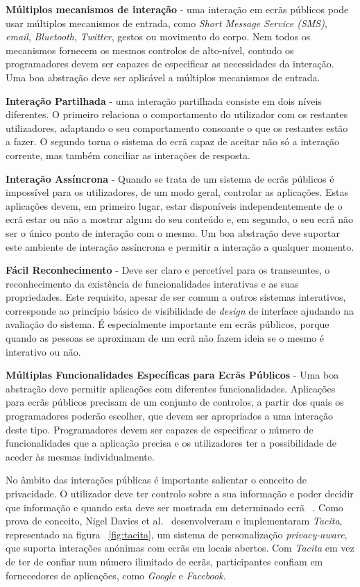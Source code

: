 \textbf{Múltiplos mecanismos de interação} - uma interação em ecrãs públicos pode usar múltiplos mecanismos de entrada, como \textit{Short Message Service (SMS)}, \textit{email}, \textit{Bluetooth}, \textit{Twitter}, gestos ou movimento do corpo. Nem todos os mecanismos fornecem os mesmos controlos de alto-nível, contudo os programadores devem ser capazes de especificar as necessidades da interação. Uma boa abstração deve ser aplicável a múltiplos mecanismos de entrada.

\textbf{Interação Partilhada} - uma interação partilhada consiste em dois níveis diferentes. O primeiro relaciona o comportamento do utilizador com os restantes utilizadores, adaptando o seu comportamento consoante o que os restantes estão a fazer. O segundo torna o sistema do ecrã capaz de aceitar não só a interação corrente, mas também conciliar as interações de resposta.

\textbf{Interação Assíncrona} - Quando se trata de um sistema de ecrãs públicos é impossível para os utilizadores, de um modo geral, controlar as aplicações. Estas aplicações devem, em primeiro lugar, estar disponíveis independentemente de o ecrã estar ou não a mostrar algum do seu conteúdo e, em segundo, o seu ecrã não ser o único ponto de interação com o mesmo. Um boa abstração deve suportar este ambiente de interação assíncrona e permitir a interação a qualquer momento.

\textbf{Fácil Reconhecimento} - Deve ser claro e percetível para os transeuntes, o reconhecimento da existência de funcionalidades interativas e as suas propriedades. Este requisito, apesar de ser comum a outros sistemas interativos, corresponde ao princípio básico de visibilidade de \textit{design} de interface ajudando na avaliação do sistema. É especialmente importante em ecrãs públicos, porque quando as pessoas se aproximam de um ecrã não fazem ideia se o mesmo é interativo ou não.

\textbf{Múltiplas Funcionalidades Específicas para Ecrãs Públicos} - Uma boa abstração deve permitir aplicações com diferentes funcionalidades. Aplicações para ecrãs públicos precisam de um conjunto de controlos, a partir dos quais os programadores poderão escolher, que devem ser apropriados a uma interação deste tipo. Programadores devem ser capazes de especificar o número de funcionalidades que a aplicação precisa e os utilizadores ter a possibilidade de aceder às mesmas individualmente.

No âmbito das interações públicas é importante salientar o conceito de privacidade. O utilizador deve ter controlo sobre a sua informação e poder decidir que informação e quando esta deve ser mostrada em determinado ecrã ~\cite{Davies2012b}. Como prova de conceito, Nigel Davies et al.~\cite{Davies2012b} desenvolveram e implementaram \textit{Tacita}, representado na figura ~\ref{fig:tacita}, um sistema de personalização \textit{privacy-aware}, que suporta interações anónimas com ecrãs em locais abertos. Com \textit{Tacita} em vez de ter de confiar num número ilimitado de ecrãs, participantes confiam em fornecedores de aplicações, como \textit{Google} e \textit{Facebook}.

